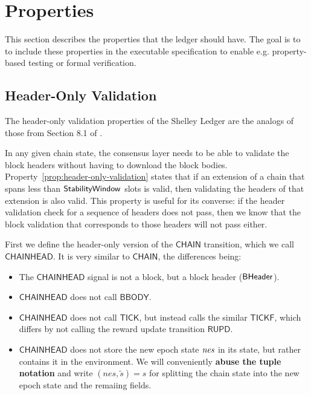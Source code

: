 \newcommand{\Val}{\fun{Val}}
\newcommand{\POV}[1]{\ensuremath{\mathsf{PresOfVal}(\mathsf{#1})}}
\newcommand{\DBE}[2]{\ensuremath{\mathsf{DBE}({#1},~{#2})}}
\newcommand{\DGO}[2]{\ensuremath{\mathsf{DGO}({#1},~{#2})}}
\newcommand{\transtar}[2]{\xlongrightarrow[\textsc{#1}]{#2}\negthickspace^{*}}

\section{Properties}
\label{sec:properties}

This section describes the properties that the ledger should have. The goal is to
to include these properties in the executable specification to enable e.g.
property-based testing or formal verification.

%

\subsection{Header-Only Validation}
\label{sec:header-only-validation}
The header-only validation properties of the Shelley Ledger are the analogs
of those from Section 8.1 of \cite{byron_chain_spec}.

In any given chain state, the consensus layer needs to be able to validate the
block headers without having to download the block bodies.
Property~\ref{prop:header-only-validation} states that if an extension of a
chain that spans less than $\mathsf{StabilityWindow}$ slots is valid, then validating the
headers of that extension is also valid. This property is useful for its
converse: if the header validation check for a sequence of headers does not
pass, then we know that the block validation that corresponds to those headers
will not pass either.

First we define the header-only version of the $\mathsf{CHAIN}$ transition,
which we call $\mathsf{CHAINHEAD}$.
It is very similar to $\mathsf{CHAIN}$, the differences being:
\begin{itemize}
  \item The $\mathsf{CHAINHEAD}$ signal is not a block, but a block header ($\mathsf{BHeader}$).
  \item $\mathsf{CHAINHEAD}$ does not call $\mathsf{BBODY}$.
  \item $\mathsf{CHAINHEAD}$ does not call $\mathsf{TICK}$, but instead
    calls the similar $\mathsf{TICKF}$, which differs by
    not calling the reward update transition $\mathsf{RUPD}$.
  \item $\mathsf{CHAINHEAD}$ does not store the new epoch state $\mathit{nes}$ in
    its state, but rather contains it in the environment.
    We will conveniently \textbf{abuse the tuple notation} and write
    $(nes, \tilde{s}) = s$
    for splitting the chain state into the new epoch state and the remaiing fields.
\end{itemize}

